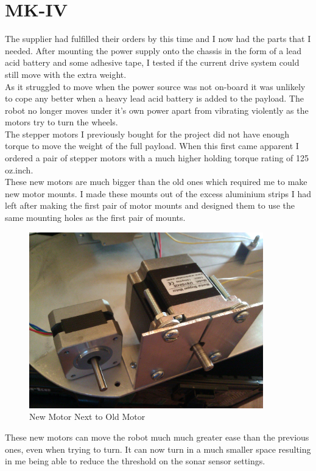 \section{MK-IV}
The supplier had fulfilled their orders by this time and I now had the parts that I needed.  After mounting the power supply onto the chassis in the form of a lead acid battery and some adhesive tape, I tested if the current drive system could still move with the extra weight.
\\As it struggled to move when the power source was not on-board it was unlikely to cope any better when a heavy lead acid battery is added to the payload.  The robot no longer moves under it's own power apart from vibrating violently as the motors try to turn the wheels.
\\The stepper motors I previously bought for the project did not have enough torque to move the weight of the full payload.  When this first came apparent I ordered a pair of stepper motors with a much higher holding torque rating of 125 oz.inch.
\\These new motors are much bigger than the old ones which required me to make new motor mounts.  I made these mounts out of the excess aluminium strips I had left after making the first pair of motor mounts and designed them to use the same mounting holes as the first pair of mounts.
\begin{figure}[H]
\centering
        \includegraphics[width=4.0in]  {Images/motor-compare.jpg}
        \caption{New Motor Next to Old Motor}
        \label{New Motor Next to Old Motor}
\end{figure}
These new motors can move the robot much much greater ease than the previous ones, even when trying to turn.  It can now turn in a much smaller space resulting in me being able to reduce the threshold on the sonar sensor settings.
